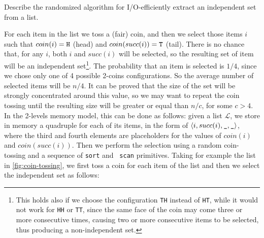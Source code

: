 \exercise

Describe the randomized algorithm for I/O-efficiently extract an independent set
from a list.

\solution

For each item in the list we toss a (fair) coin, and then we select those items
$i$ such that $coin(i) = \text{\tt H}$ (head) and $coin(succ(i)) = \text{\tt T}$
(tail). There is no chance that, for any $i$, both $i$ and $succ(i)$ will be
selected, so the resulting set of item will be an independent set\footnote{This
holds also if we choose the configuration {\tt TH} instead of {\tt HT}, while it
would not work for {\tt HH} or {\tt TT}, since the same face of the coin may
come three or more consecutive times, causing two or more consecutive items to
be selected, thus producing a non-independent set.}. The probability that an
item is selected is $1/4$, since we chose only one of 4 possible 2-coins
configurations. So the average number of selected items will be $n/4$. It can be
proved that the size of the set will be strongly concentrated around this value,
so we may want to repeat the coin tossing until the resulting size will be
greater or equal than $n/c$, for some $c > 4$. In the 2-levels memory model,
this can be done as follows: given a list $\mathcal{L}$, we store in memory a
quadruple for each of its items, in the form of $\langle i, succ(i), \text{\tt
\_}, \text{\tt \_} \rangle$, where the third and fourth elements are
placeholders for the values of $coin(i)$ and $coin(succ(i))$. Then we perform
the selection using a random coin-tossing and a sequence of {\tt sort} and {\tt
scan} primitives. Taking for example the list in \autoref{fig:coin-tossing}, we
first toss a coin for each item of the list and then we select the independent
set as follows:
%
